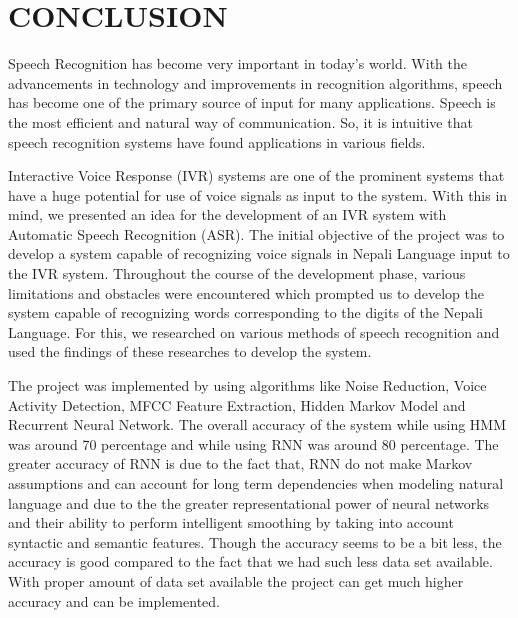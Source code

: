 

\section{CONCLUSION}
Speech Recognition has become very important in today's world. With the advancements in technology and improvements in recognition algorithms, speech has become one of the primary source of input for many applications. Speech is the most efficient and natural way of communication. So, it is intuitive that speech recognition systems have found applications in various fields. 

Interactive Voice Response (IVR) systems are one of the prominent systems that have a huge potential for use of voice signals as input to the system. With this in mind, we presented an idea for the development of an IVR system with Automatic Speech Recognition (ASR). The initial objective of the project was to develop a system capable of recognizing voice signals in Nepali Language input to the IVR system. Throughout the course of the development phase, various limitations and obstacles were encountered which prompted us to develop the system capable of recognizing words corresponding to the digits of the Nepali Language. For this, we researched on various methods of speech recognition and used the findings of these researches to develop the system. 

The project was implemented by using algorithms like Noise Reduction, Voice Activity Detection, MFCC Feature Extraction, Hidden Markov Model and Recurrent Neural Network. The overall accuracy of the system while using HMM was around 70 percentage and while using RNN was around 80 percentage. The greater accuracy of RNN is due to the fact that, RNN do not make Markov assumptions and can account for long term dependencies when modeling natural language and due to the the greater representational power of neural networks and their ability to perform intelligent smoothing by taking into account syntactic and semantic features. Though the accuracy seems to be a bit less, the accuracy is good compared to the fact that we had such less data set available. With proper amount of data set available the project can get much higher accuracy and can be implemented.



